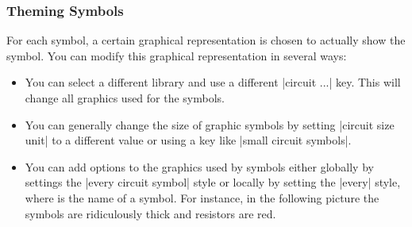 \subsubsection{Theming Symbols}
\label{section-theming-symbols}
For each symbol, a certain graphical representation is chosen to
actually show the symbol. You can modify this graphical representation
in several ways:

\begin{itemize}
\item You can select a different library and use a different
  |circuit ...| key. This will change all graphics used for the
  symbols.
\item You can generally change the size of graphic symbols by setting
  |circuit size unit| to a different value or using a key like
  |small circuit symbols|.
\item
  You can add options to the graphics used by symbols either globally
  by settings the |every circuit symbol| style or locally by setting the
  |every|  style, where  is the name of a
  symbol. For instance, in the following picture the symbols are
  ridiculously thick and resistors are red.
\begin{codeexample}[]
\begin{tikzpicture}
  [circuit ee IEC,
   every symbol/.style={ultra thick},
   every resistor/.style={red}]


\end{tikzpicture}
\end{codeexample}
\end{itemize}
